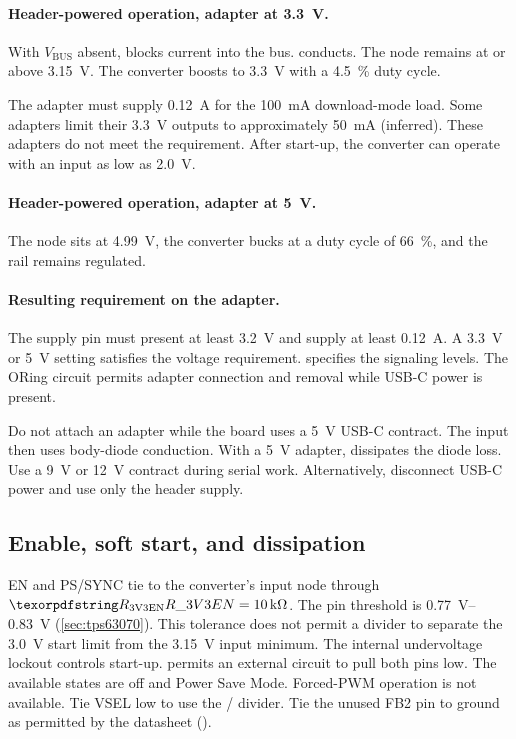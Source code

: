 \paragraph{Header-powered operation, adapter at \SI{3.3}{\volt}.} With
$V_{\mathrm{BUS}}$ absent,  blocks current into the bus.
 conducts. The node remains at or above
\SI{3.15}{\volt}. The converter boosts to \SI{3.3}{\volt} with a
\SI{4.5}{\percent} duty cycle.

The adapter must supply \SI{0.12}{\ampere} for the
\SI{100}{\milli\ampere} download-mode load. Some adapters limit their
\SI{3.3}{\volt} outputs to approximately \SI{50}{\milli\ampere} (inferred).
These adapters do not meet the requirement. After start-up, the converter can
operate with an input as low as \SI{2.0}{\volt}.

\paragraph{Header-powered operation, adapter at \SI{5}{\volt}.} The node sits at
\SI{4.99}{\volt}, the converter bucks at a duty cycle of \SI{66}{\percent}, and
the rail remains regulated.

\paragraph{Resulting requirement on the adapter.}\label{sec:3v3-adapter} The
supply pin must present at least \SI{3.2}{\volt} and supply at least
\SI{0.12}{\ampere}. A \SI{3.3}{\volt} or \SI{5}{\volt} setting satisfies the
voltage requirement.  specifies the signaling levels.
The ORing circuit permits adapter connection and removal while USB-C power is
present.

Do not attach an adapter while the board uses a \SI{5}{\volt} USB-C contract.
The input then uses body-diode conduction. With a \SI{5}{\volt} adapter,
 dissipates the diode loss. Use a \SI{9}{\volt} or
\SI{12}{\volt} contract during serial work. Alternatively, disconnect USB-C
power and use only the header supply.

\subsection{Enable, soft start, and dissipation}\label{sec:3v3-house}

EN and PS/SYNC tie to the converter's input node through
$\des{R}{3V3EN}=\SI{10}{\kilo\ohm}$. The pin threshold is
\SIrange{0.77}{0.83}{\volt} (\cref{sec:tps63070}). This tolerance does not
permit a divider to separate the \SI{3.0}{\volt} start limit from the
\SI{3.15}{\volt} input minimum. The internal undervoltage lockout controls
start-up.  permits an external circuit to pull both pins low.
The available states are off and Power Save Mode. Forced-PWM operation is not
available. Tie VSEL low to use the / divider. Tie
the unused FB2 pin to ground as permitted by the datasheet
().

